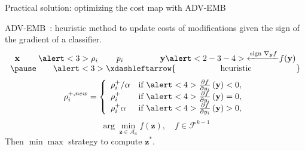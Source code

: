 \documentclass[10pt]{beamer}
\newcommand{\fset}{\mathcal{F}}
\begin{document}
\begin{frame}{Practical solution: optimizing the cost map with ADV-EMB}


ADV-EMB~: heuristic method to update \alert<1>{costs} of modifications given the sign of the gradient of a classifier.
\pause
\begin{equation*}
    \begin{array}{cc}
    \mathbf{x} \hspace{2.2em} \alert<3>{\rho_i} \hspace{2.2em} p_i \hspace{4.4em} \mathbf{y} \alert<2-3-4>{\xleftarrow{\text{sign }\nabla_{\mathbf{y}}f}} f(\mathbf{y}) \\ \pause
    \hspace{2em} \alert<3>{\xdashleftarrow{\text{\hspace{5em} heuristic \hspace{5em}}}}
    \end{array}
\end{equation*}
\pause
\begin{equation}
\rho_{i}^{+, new} = 
\left\{
    \begin{array}{ll}
        \rho_{i}^+/\alpha & \mbox{if } \alert<4>{\frac{\partial f}{\partial y_{i}}\left(\mathbf{y}\right)} < 0, \\
        \rho_{i}^+ & \mbox{if } \alert<4>{\frac{\partial f}{\partial y_{i}}\left(\mathbf{y}\right)} = 0, \\
        \rho_{i}^+ \alpha & \mbox{if } \alert<4>{\frac{\partial f}{\partial y_{i}}\left(\mathbf{y}\right)} > 0,
    \end{array}
\right.
\label{eq:qplus}
\end{equation}
\pause
\begin{equation}
\arg \min_{\mathbf{z} \in \mathcal{A}_a} f(\mathbf{z}), \quad  f \in \fset^{k-1}
\end{equation}
\pause
Then $\min\max$ strategy to compute $\mathbf{z}^\ast$.

\end{frame}
\end{document}
